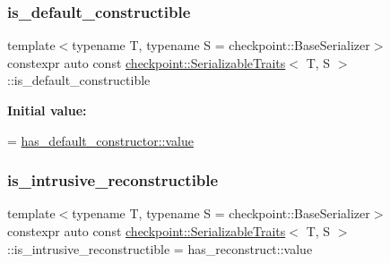 \subsubsection{\texorpdfstring{is\+\_\+default\+\_\+constructible}{is\_default\_constructible}}
{\footnotesize\ttfamily template$<$typename T, typename S = checkpoint\+::\+Base\+Serializer$>$ \\
constexpr auto const \hyperlink{structcheckpoint_1_1_serializable_traits}{checkpoint\+::\+Serializable\+Traits}$<$ T, S $>$\+::is\+\_\+default\+\_\+constructible\hspace{0.3cm}{\ttfamily [static]}}

{\bfseries Initial value\+:}
\begin{DoxyCode}
=
    \hyperlink{structdetection_1_1detector_a6d7d0e1bdf5903db9edbe448edccf83b}{has\_default\_constructor::value}
\end{DoxyCode}
\mbox{\label{structcheckpoint_1_1_serializable_traits_a9879da69f4597dfb32b869142c1c46c9}} 
\subsubsection{\texorpdfstring{is\+\_\+intrusive\+\_\+reconstructible}{is\_intrusive\_reconstructible}}
{\footnotesize\ttfamily template$<$typename T, typename S = checkpoint\+::\+Base\+Serializer$>$ \\
constexpr auto const \hyperlink{structcheckpoint_1_1_serializable_traits}{checkpoint\+::\+Serializable\+Traits}$<$ T, S $>$\+::is\+\_\+intrusive\+\_\+reconstructible = has\+\_\+reconstruct\+::value\hspace{0.3cm}{\ttfamily [static]}}

\mbox{\label{structcheckpoint_1_1_serializable_traits_a35d5afbe97197885a1513765a210837c}} 
